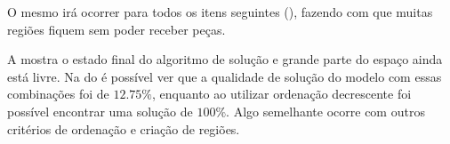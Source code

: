 

O mesmo irá ocorrer para todos os itens seguintes (), fazendo com que muitas
regiões fiquem sem poder receber peças.



A  mostra o estado final do algoritmo de solução e grande parte do espaço
ainda está livre.
Na  do  é possível ver que a qualidade de solução do modelo com
essas combinações foi de $12.75\%$, enquanto ao utilizar ordenação decrescente foi possível
encontrar uma solução de $100\%$.
Algo semelhante ocorre com outros critérios de ordenação e criação de regiões.


